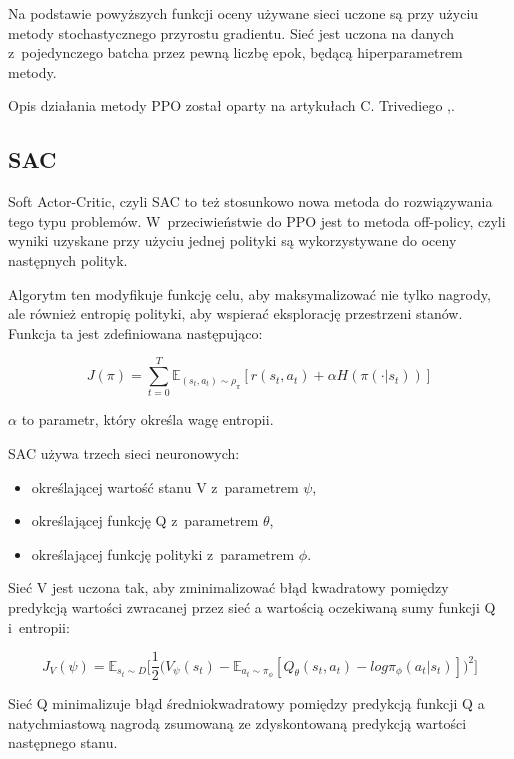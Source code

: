 \documentclass[a4paper,12pt]{article}
\begin{document}
Na podstawie powyższych funkcji oceny używane sieci uczone są przy użyciu metody stochastycznego przyrostu gradientu. Sieć jest uczona na danych z~pojedynczego batcha przez pewną liczbę epok, będącą hiperparametrem metody.

Opis działania metody PPO został oparty na artykułach C. Trivediego \cite{ppo1},\cite{ppo2}.


\subsection{SAC}
Soft Actor-Critic, czyli SAC to też stosunkowo nowa metoda do rozwiązywania tego typu problemów. W~przeciwieństwie do PPO jest to metoda off-policy, czyli wyniki uzyskane przy użyciu jednej polityki są wykorzystywane do oceny następnych polityk.

Algorytm ten modyfikuje funkcję celu, aby maksymalizować nie tylko nagrody, ale również entropię polityki, aby wspierać eksplorację przestrzeni stanów. Funkcja ta jest zdefiniowana następująco:

\begin{equation}
	J(\pi) = \sum_{t=0}^T \mathbb{E}_{(s_t,a_t) \sim \rho_\pi} [r(s_t,a_t) + \alpha H(\pi(\cdot |s_t))]
\end{equation}

$\alpha$ to parametr, który określa wagę entropii.

SAC używa trzech sieci neuronowych:
\begin{itemize}
	\item określającej wartość stanu V z~parametrem $\psi$,
	\item określającej funkcję Q z~parametrem $\theta$,
	\item określającej funkcję polityki z~parametrem $\phi$.
\end{itemize}

Sieć V jest uczona tak, aby zminimalizować błąd  kwadratowy pomiędzy predykcją wartości zwracanej przez sieć a wartością oczekiwaną sumy funkcji Q i~entropii:

\begin{equation}
J_V(\psi) = \mathbb{E}_{s_t \sim D}\Big[ \frac{1}{2}\big(V_\psi(s_t) - \mathbb{E}_{a_t \sim\pi_\phi} [Q_\theta(s_t,a_t) - log \pi_\phi (a_t|s_t)] \big)^2\Big]
\end{equation}

Sieć Q minimalizuje błąd średniokwadratowy pomiędzy predykcją funkcji Q a natychmiastową nagrodą zsumowaną ze zdyskontowaną predykcją wartości następnego stanu.
\end{document}
